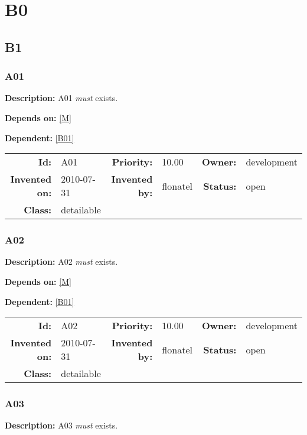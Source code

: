 \chapter{B0}
\section{B1}
\subsection{A01}\label{A01}
\textbf{Description:} A01 \textsl{must} exists.

\textbf{Depends on:} \ref{M} 

\textbf{Dependent:} \ref{B01} 

\par
{\small \begin{center}\begin{tabular}{rlrlrl}
\textbf{Id:} & A01  & \textbf{Priority:} & 10.00  & \textbf{Owner:} & development\\ 
\textbf{Invented on:} & 2010-07-31  & \textbf{Invented by:} & flonatel  & \textbf{Status:} & open \\ 
\textbf{Class:} & detailable  & & & \end{tabular}\end{center} }
\subsection{A02}\label{A02}
\textbf{Description:} A02 \textsl{must} exists.

\textbf{Depends on:} \ref{M} 

\textbf{Dependent:} \ref{B01} 

\par
{\small \begin{center}\begin{tabular}{rlrlrl}
\textbf{Id:} & A02  & \textbf{Priority:} & 10.00  & \textbf{Owner:} & development\\ 
\textbf{Invented on:} & 2010-07-31  & \textbf{Invented by:} & flonatel  & \textbf{Status:} & open \\ 
\textbf{Class:} & detailable  & & & \end{tabular}\end{center} }
\subsection{A03}\label{A03}
\textbf{Description:} A03 \textsl{must} exists.

